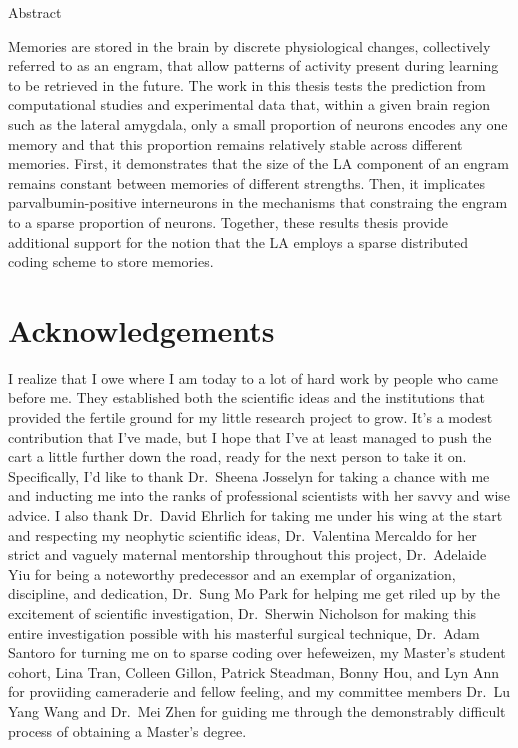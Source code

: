 \documentclass[12pt,a4paperpaper,]{report}
\begin{document}
\normalsize
{}

\Large
\noindent
Abstract

\normalsize
{} \noindent
Memories are stored in the brain by discrete physiological changes,
collectively referred to as an engram, that allow patterns of activity
present during learning to be retrieved in the future. The work in this
thesis tests the prediction from computational studies and experimental
data that, within a given brain region such as the lateral amygdala,
only a small proportion of neurons encodes any one memory and that this
proportion remains relatively stable across different memories. First,
it demonstrates that the size of the LA component of an engram remains
constant between memories of different strengths. Then, it implicates
parvalbumin-positive interneurons in the mechanisms that constraing the
engram to a sparse proportion of neurons. Together, these results thesis
provide additional support for the notion that the LA employs a sparse
distributed coding scheme to store memories.


\chapter*{Acknowledgements}\label{acknowledgements}

I realize that I owe where I am today to a lot of hard work by people
who came before me. They established both the scientific ideas and the
institutions that provided the fertile ground for my little research
project to grow. It's a modest contribution that I've made, but I hope
that I've at least managed to push the cart a little further down the
road, ready for the next person to take it on. Specifically, I'd like to
thank Dr.~Sheena Josselyn for taking a chance with me and inducting me
into the ranks of professional scientists with her savvy and wise
advice. I also thank Dr.~David Ehrlich for taking me under his wing at
the start and respecting my neophytic scientific ideas, Dr.~Valentina
Mercaldo for her strict and vaguely maternal mentorship throughout this
project, Dr.~Adelaide Yiu for being a noteworthy predecessor and an
exemplar of organization, discipline, and dedication, Dr.~Sung Mo Park
for helping me get riled up by the excitement of scientific
investigation, Dr.~Sherwin Nicholson for making this entire
investigation possible with his masterful surgical technique, Dr.~Adam
Santoro for turning me on to sparse coding over hefeweizen, my Master's
student cohort, Lina Tran, Colleen Gillon, Patrick Steadman, Bonny Hou,
and Lyn Ann for proviiding cameraderie and fellow feeling, and my
committee members Dr.~Lu Yang Wang and Dr.~Mei Zhen for guiding me
through the demonstrably difficult process of obtaining a Master's
degree.
\end{document}
